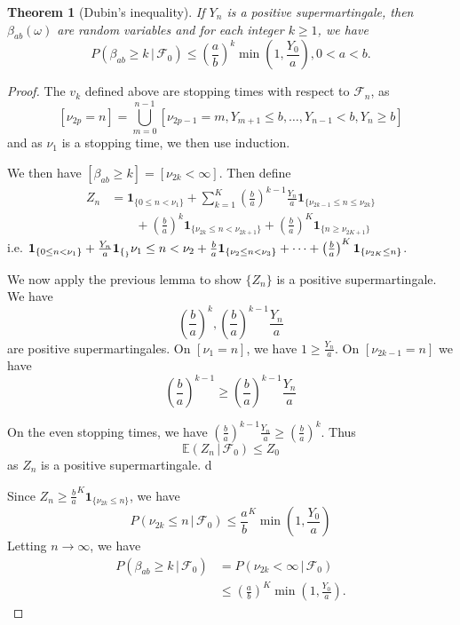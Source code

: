 \documentclass[10pt, oneside, reqno]{amsart}
\theoremstyle{plain}%
\newtheorem{thm}{Theorem}[section]
\theoremstyle{definition}
\theoremstyle{remark}
\newcommand{\given}{ \, | \,}
\newcommand{\sigf}{\mathcal{F}}
\newcommand{\E}{\mathbb{E}}
\newcommand{\indic}[1]{\mathbf{1}_{\{ #1 \}} }
\begin{document}
\begin{thm}[Dubin's inequality] If $Y_n$ is a positive supermartingale, then $\beta_{ab}(\omega)$ are random variables and for each integer $k \geq 1$, we have \[
	P(\beta_{ab} \geq k \given \sigf_0) \leq (\frac{a}{b})^k \min(1, \frac{Y_0}{a}), 0 < a < b.
\]	
\end{thm} 
\begin{proof}
	The $v_k$ defined above are stopping times with respect to $\sigf_n$, as \[ 
		[\nu_{2p} = n] = \bigcup_{m=0}^{n-1} [\nu_{2p-1} = m, Y_{m+1} \leq b, \dots, Y_{n-1} < b, Y_n \geq b ]
\] and as $\nu_1$ is a stopping time, we then use induction.   

	We then have $[\beta_{ab} \geq k] = [\nu_{2k} < \infty]$.  Then define \begin{align*}
		Z_n &= \indic{0 \leq n < \nu_1} + \sum_{k=1}^K (\frac{b}{a})^{k-1} \frac{Y_n}{a} \indic{\nu_{2k-1} \leq n \leq \nu_{2k}} \\
			&\qquad + \left(\frac{b}{a}\right)^k \indic{\nu_{2k} \leq n < \nu_{2k+1}} + \left( \frac{b}{a} \right)^K \indic{n \geq \nu_{2K+1}}
	\end{align*} 
	i.e. $\indic{0 \leq n < \nu_1} + \frac{Y_n}{a} \indic_{\nu_1 \leq n < \nu_2} + \frac{b}{a} \indic{\nu_2 \leq n < \nu_3} + \dots + \left( \frac{b}{a} \right)^K \indic{\nu_{2K} \leq n}$. 
	
	We now apply the previous lemma to show $\{ Z_n \}$ is a positive supermartingale.  We have \[
		\left( \frac{b}{a} \right)^k, \left( \frac{b}{a} \right)^{k-1} \frac{Y_n}{a}
	\] are positive supermartingales.  On $[ \nu_1 = n]$, we have $1 \geq \frac{Y_n}{a}$.  On $[\nu_{2k-1} = n]$ we have \[
		\left(\frac{b}{a} \right)^{k-1} \geq \left(\frac{b}{a} \right)^{k-1} \frac{Y_n}{a}
	\]
	
	On the even stopping times, we have $\left(\frac{b}{a} \right)^{k-1} \frac{Y_n}{a} \geq \left(\frac{b}{a} \right)^{k}$.  Thus \[
		\E(Z_n \given \sigf_0) \leq Z_0
	\] as $Z_n$ is a positive supermartingale. d
	
	Since $Z_n \geq \frac{b}{a}^K \indic{\nu_{2k} \leq n}$, we have \[
		P(\nu_{2k} \leq n \, | \, \sigf_0) \leq \frac{a}{b}^K \min(1, \frac{Y_0}{a}) 
	\]  Letting $n \rightarrow \infty$, we have 
	\begin{align*}
		P(\beta_{ab} \geq k \given \sigf_0) &= P(\nu_{2k} < \infty \given \sigf_0) \\
		 		&\leq \left( \frac{a}{b} \right)^K \min(1, \frac{Y_0}{a}).  
	\end{align*}
\end{proof}
\end{document}
